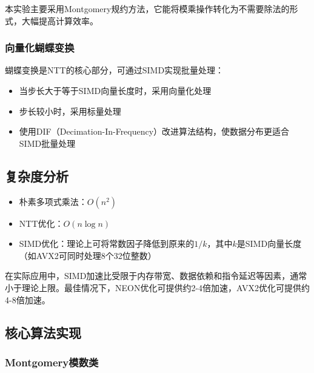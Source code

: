 \documentclass[a4paper,colorlinks=true,linkcolor=blue,urlcolor=blue,citecolor=green,bookmarks=true]{article}
\begin{document}
本实验主要采用Montgomery规约方法，它能将模乘操作转化为不需要除法的形式，大幅提高计算效率。

\subsubsection{向量化蝴蝶变换}
蝴蝶变换是NTT的核心部分，可通过SIMD实现批量处理：
\begin{itemize}
  \item 当步长大于等于SIMD向量长度时，采用向量化处理
  \item 步长较小时，采用标量处理
  \item 使用DIF（Decimation-In-Frequency）改进算法结构，使数据分布更适合SIMD批量处理
\end{itemize}

\subsection{复杂度分析}
\begin{itemize}
  \item 朴素多项式乘法：$O(n^2)$
  \item NTT优化：$O(n\log n)$
  \item SIMD优化：理论上可将常数因子降低到原来的$1/k$，其中$k$是SIMD向量长度（如AVX2可同时处理8个32位整数）
\end{itemize}

在实际应用中，SIMD加速比受限于内存带宽、数据依赖和指令延迟等因素，通常小于理论上限。最佳情况下，NEON优化可提供约2-4倍加速，AVX2优化可提供约4-8倍加速。

\subsection{核心算法实现}

\subsubsection{Montgomery模数类}
\end{document}
